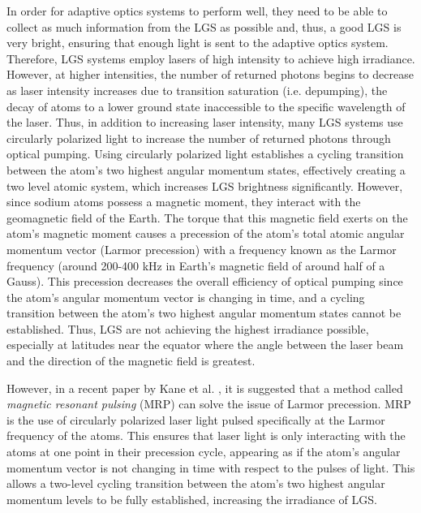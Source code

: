\documentclass[]{article}
\begin{document}
In order for adaptive optics systems to perform well, they need to be able to collect as much information from the LGS as possible and, thus, a good LGS is very bright, ensuring that enough light is sent to the adaptive optics system. Therefore, LGS systems employ lasers of high intensity to achieve high irradiance. However, at higher intensities, the number of returned photons begins to decrease as laser intensity increases due to transition saturation (i.e. depumping), the decay of atoms to a lower ground state inaccessible to the specific wavelength of the laser. Thus, in addition to increasing laser intensity, many LGS systems use circularly polarized light to increase the number of returned photons through optical pumping. Using circularly polarized light establishes a cycling transition between the atom's two highest angular momentum states, effectively creating a two level atomic system, which increases LGS brightness significantly. However, since sodium atoms possess a magnetic moment, they interact with the geomagnetic field of the Earth. The torque that this magnetic field exerts on the atom's magnetic moment causes a precession of the atom's total atomic angular momentum vector (Larmor precession) with a frequency known as the Larmor frequency (around 200-400 kHz in Earth's magnetic field of around half of a Gauss). This precession decreases the overall efficiency of optical pumping since the atom's angular momentum vector is changing in time, and a cycling transition between the atom's two highest angular momentum states cannot be established. Thus, LGS are not achieving the highest irradiance possible, especially at latitudes near the equator where the angle between the laser beam and the direction of the magnetic field is greatest.

\thispagestyle{empty}
However, in a recent paper by Kane et al. \cite{Kane2014}, it is suggested that a method called \textit{magnetic resonant pulsing} (MRP) can solve the issue of Larmor precession. MRP is the use of circularly polarized laser light pulsed specifically at the Larmor frequency of the atoms. This ensures that laser light is only interacting with the atoms at one point in their precession cycle, appearing as if the atom's angular momentum vector is not changing in time with respect to the pulses of light. This allows a two-level cycling transition between the atom's two highest angular momentum levels to be fully established, increasing the irradiance of LGS.
\end{document}
